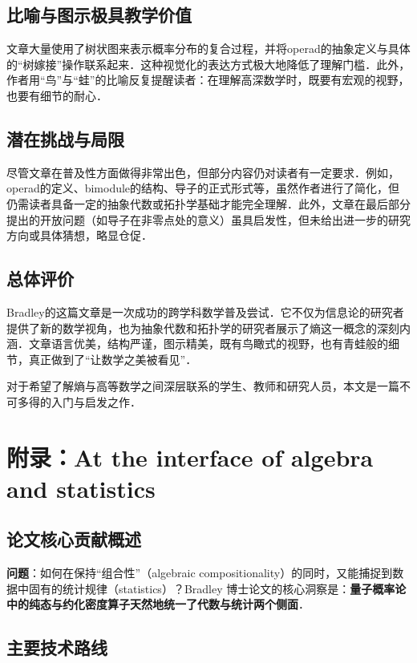 \documentclass[10pt, openany]{book}
\begin{document}
\section{比喻与图示极具教学价值}

文章大量使用了树状图来表示概率分布的复合过程，并将operad的抽象定义与具体的“树嫁接”操作联系起来．这种视觉化的表达方式极大地降低了理解门槛．此外，作者用“鸟”与“蛙”的比喻反复提醒读者：在理解高深数学时，既要有宏观的视野，也要有细节的耐心．

\section{潜在挑战与局限}

尽管文章在普及性方面做得非常出色，但部分内容仍对读者有一定要求．例如，operad的定义、bimodule的结构、导子的正式形式等，虽然作者进行了简化，但仍需读者具备一定的抽象代数或拓扑学基础才能完全理解．此外，文章在最后部分提出的开放问题（如导子在非零点处的意义）虽具启发性，但未给出进一步的研究方向或具体猜想，略显仓促．

\section{总体评价}

Bradley的这篇文章是一次成功的跨学科数学普及尝试．它不仅为信息论的研究者提供了新的数学视角，也为抽象代数和拓扑学的研究者展示了熵这一概念的深刻内涵．文章语言优美，结构严谨，图示精美，既有鸟瞰式的视野，也有青蛙般的细节，真正做到了“让数学之美被看见”．

对于希望了解熵与高等数学之间深层联系的学生、教师和研究人员，本文是一篇不可多得的入门与启发之作．


\chapter{附录：At the interface of algebra and statistics}

\cite{Bradley2020interface}

\section{论文核心贡献概述}

\noindent
\textbf{问题}：如何在保持“组合性”（algebraic compositionality）的同时，又能捕捉到数据中固有的统计规律（statistics）？Bradley 博士论文的核心洞察是：\textbf{量子概率论中的纯态与约化密度算子天然地统一了代数与统计两个侧面}．

\section{主要技术路线}
\end{document}
